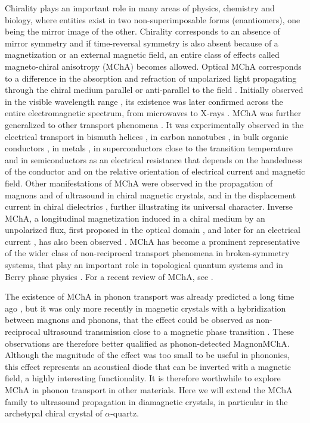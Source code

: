 \documentclass[prl,twocolumn]{revtex4-2}
\begin{document}
Chirality plays an important role in many areas of physics, chemistry and
biology, where entities exist in two non-superimposable forms (enantiomers),
one being the mirror image of the other. Chirality corresponds to an absence
of mirror symmetry and if time-reversal symmetry is also absent because of a
magnetization or an external magnetic field, an entire class of effects
called magneto-chiral anisotropy (MChA) becomes allowed. Optical MChA
corresponds to a difference in the absorption and refraction of unpolarized
light propagating through the chiral medium parallel or anti-parallel to the
field \cite{WagniereMeier,BarronVbrancich}. Initially observed in the
visible wavelength range \cite{Naturemca,kleindienst,mcaabs}, its existence
was later confirmed across the entire electromagnetic spectrum, from
microwaves \cite{MicrowaveMChA} to X-rays \cite{XrayMChA}. MChA was further
generalized to other transport phenomena \cite{emchaprl}. It was
experimentally observed in the electrical transport in bismuth helices \cite
{emchaprl}, in carbon nanotubes \cite{eMChACNT}, in bulk organic conductors
\cite{Pop}, in metals \cite{Yokouchi,Aoki}, in superconductors close to the
transition temperature \cite{MChAsupercon} and in semiconductors \cite
{RikkenTe} as an electrical resistance that depends on the handedness of the
conductor and on the relative orientation of electrical current and magnetic
field. Other manifestations of MChA were observed in the propagation of
magnons \cite{MagnonMChA} and of ultrasound \cite{USMChA1,USMChA2} in chiral
magnetic crystals, and in the displacement current in chiral dielectrics
\cite{dMChA-Rikken}, further illustrating its universal character. Inverse
MChA, a longitudinal magnetization induced in a chiral medium by an
unpolarized flux, first proposed in the optical domain \cite{Theory-ioMChA},
and later for an electrical current \cite{Theory-ieMChA}, has also been
observed \cite{Exp-ieMChA}. MChA has become a prominent representative of
the wider class of non-reciprocal transport phenomena in broken-symmetry
systems, that play an important role in topological quantum systems and in
Berry phase physics \cite{Non-reciproc-review}. For a recent review of MChA,
see \cite{Review-MChA}.

The existence of MChA in phonon transport was already predicted a long time
ago \cite{emchaprl}, but it was only more recently in magnetic crystals with
a hybridization between magnons and phonons, that the effect could be
observed as non-reciprocal ultrasound transmission close to a magnetic phase
transition \cite{USMChA1,USMChA2}. These observations are therefore better
qualified as phonon-detected MagnonMChA. Although the magnitude of the
effect was too small to be useful in phononics, this effect represents an
acoustical diode that can be inverted with a magnetic field, a highly
interesting functionality. It is therefore worthwhile to explore MChA in
phonon transport in other materials. Here we will extend the MChA family to
ultrasound propagation in diamagnetic crystals, in particular in the
archetypal chiral crystal of $\alpha$-quartz.
\end{document}
